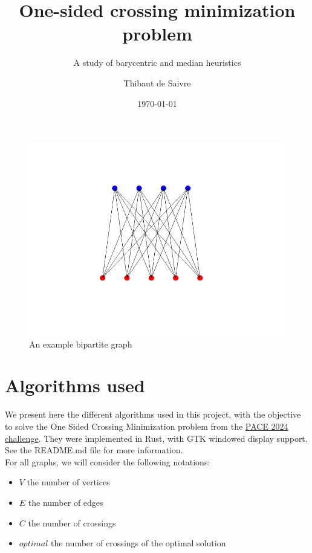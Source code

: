 \documentclass[a4paper]{article}
\author{Thibaut de Saivre}
\date{\today}
\title{One-sided crossing minimization problem}
\subtitle{A study of barycentric and median heuristics}
\begin{document}
\maketitle

\tableofcontents

\begin{figure}[ht]
	\centering
	\includegraphics[width=1\textwidth]{images/graph_example.png}
	\caption{An example bipartite graph}
	\label{fig:image1} %
\end{figure}

\eject

\section{Algorithms used}

We present here the different algorithms used in this project, with the objective to solve the One Sided Crossing Minimization problem from the \href{https://pacechallenge.org/2024/}{PACE 2024 challenge}. They were implemented in Rust, with GTK windowed display support. See the README.md file for more information.\\

For all graphs, we will consider the following notations:
\begin{itemize}
	\item $V$ the number of vertices
	\item $E$ the number of edges
	\item $C$ the number of crossings
	\item $optimal$ the number of crossings of the optimal solution\\
\end{itemize}
\end{document}
